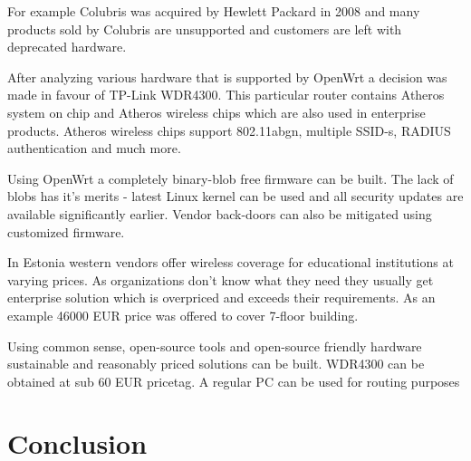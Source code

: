 \documentclass{article}
\begin{document}
For example Colubris was acquired by Hewlett Packard in 2008 and many products
sold by Colubris are unsupported and customers are left with
deprecated hardware.

After analyzing various hardware that is supported by OpenWrt
a decision was made in favour of TP-Link WDR4300.
This particular router
contains Atheros system on chip and Atheros wireless chips
which are also used in enterprise products.
Atheros wireless chips support 802.11abgn, multiple SSID-s,
RADIUS authentication and much more.

Using OpenWrt a completely binary-blob free firmware can be built.
The lack of blobs has it's merits - latest Linux kernel can be used
and all security updates are available significantly earlier.
Vendor back-doors can also be mitigated using customized firmware.


In Estonia western vendors offer wireless coverage for educational institutions
at varying prices.
As organizations don't know what they need they usually get enterprise solution which
is overpriced and exceeds their requirements.
As an example 46000 EUR price was offered to cover 7-floor building.

Using common sense, open-source tools and open-source friendly hardware
sustainable and reasonably priced solutions can be built.
WDR4300 can be obtained at sub 60 EUR pricetag.
A regular PC can be used for routing purposes






\section{Conclusion}





\end{document}

